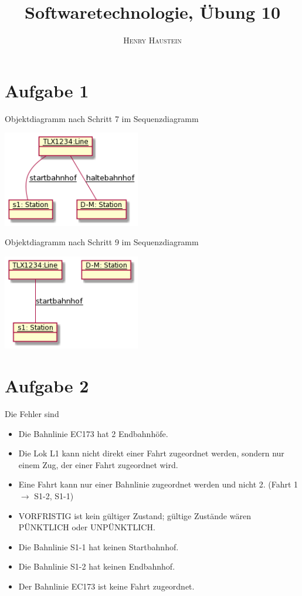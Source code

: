 \documentclass{article}
\title{\textbf{Softwaretechnologie, Übung 10}}
\author{\textsc{Henry Haustein}}
\date{}
\begin{document}
	\maketitle
	
	\section*{Aufgabe 1}
	Objektdiagramm nach Schritt 7 im Sequenzdiagramm
	\begin{center}
		\includegraphics[width=0.45\textwidth]{./Aufgabe10_1a}
	\end{center}
	Objektdiagramm nach Schritt 9 im Sequenzdiagramm
	\begin{center}
		\includegraphics[width=0.45\textwidth]{./Aufgabe10_1b}
	\end{center}

	\section*{Aufgabe 2}
	Die Fehler sind
	\begin{itemize}
		\item Die Bahnlinie EC173 hat 2 Endbahnhöfe.
		\item Die Lok L1 kann nicht direkt einer Fahrt zugeordnet werden, sondern nur einem Zug, der einer Fahrt zugeordnet wird.
		\item Eine Fahrt kann nur einer Bahnlinie zugeordnet werden und nicht 2. (Fahrt 1 $\to$ S1-2, S1-1)
		\item VORFRISTIG ist kein gültiger Zustand; gültige Zustände wären PÜNKTLICH oder UNPÜNKTLICH.
		\item Die Bahnlinie S1-1 hat keinen Startbahnhof.
		\item Die Bahnlinie S1-2 hat keinen Endbahnhof.
		\item Der Bahnlinie EC173 ist keine Fahrt zugeordnet.
	\end{itemize}
\end{document}
